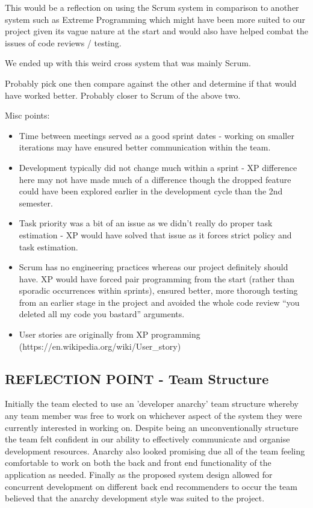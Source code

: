 \documentclass{l3proj}
\begin{document}
This would be a reflection on using the Scrum system in comparison to another system such as Extreme Programming which might have been more suited to our project given its vague nature at the start and would also have helped combat the issues of code reviews / testing.

We ended up with this weird cross system that was mainly Scrum.

Probably pick one then compare against the other and determine if that would have worked better. Probably closer to Scrum of the above two.

Misc points:
\begin{itemize}
\item Time between meetings served as a good sprint dates - working on smaller iterations may have ensured better communication within the team.
\item Development typically did not change much within a sprint - XP difference here may not have made much of a difference though the dropped feature could have been explored earlier in the development cycle than the 2nd semester.
\item Task priority was a bit of an issue as we didn’t really do proper task estimation - XP would have solved that issue as it forces strict policy and task estimation.
\item Scrum has no engineering practices whereas our project definitely should have. XP would have forced pair programming from the start (rather than sporadic occurrences within sprints), ensured better, more thorough testing from an earlier stage in the project and avoided the whole code review “you deleted all my code you bastard” arguments.
\item User stories are originally from XP programming (https://en.wikipedia.org/wiki/User_story)
\end{itemize}


\subsection{REFLECTION POINT - Team Structure}
\label{sec:teamstructure}

Initially the team elected to use an 'developer anarchy' team structure whereby any team member was free to work on whichever aspect of the system they were currently interested in working on. Despite being an unconventionally structure the team felt confident in our ability to effectively communicate and organise development resources. Anarchy also looked promising due all of the team feeling comfortable to work on both the back and front end functionality of the application as needed. Finally as the proposed system design allowed for concurrent development on different back end recommenders to occur the team believed that the anarchy development style was suited to the project.
\end{document}
